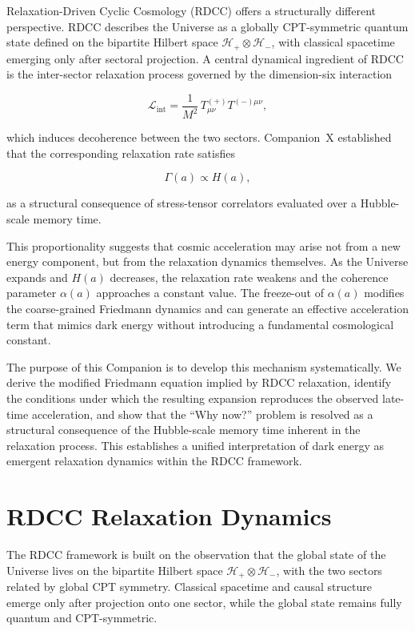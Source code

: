 \documentclass[11pt,a4paper]{article}
\newcommand{\Hglobal}{\mathcal{H}_{+}\!\otimes\!\mathcal{H}_{-}}
\newcommand{\LintDef}{\mathcal{L}_{\mathrm{int}} = \frac{1}{M^{2}}\, T^{(+)}_{\mu\nu} T^{(-)\mu\nu}}
\newcommand{\Ha}{H(a)}
\newcommand{\GammaR}{\Gamma}
\newcommand{\alphaR}{\alpha}
\begin{document}
Relaxation-Driven Cyclic Cosmology (RDCC) offers a structurally different
perspective. RDCC describes the Universe as a globally CPT-symmetric quantum
state defined on the bipartite Hilbert space $\Hglobal$, with classical
spacetime emerging only after sectoral projection. A central dynamical
ingredient of RDCC is the inter-sector relaxation process governed by the
dimension-six interaction


\[
\LintDef,
\]


which induces decoherence between the two sectors. Companion~X established that
the corresponding relaxation rate satisfies


\[
\GammaR(a) \propto \Ha,
\]


as a structural consequence of stress-tensor correlators evaluated over a
Hubble-scale memory time.

This proportionality suggests that cosmic acceleration may arise not from a new
energy component, but from the relaxation dynamics themselves. As the Universe
expands and $\Ha$ decreases, the relaxation rate weakens and the coherence
parameter $\alphaR(a)$ approaches a constant value. The freeze-out of
$\alphaR(a)$ modifies the coarse-grained Friedmann dynamics and can generate an
effective acceleration term that mimics dark energy without introducing a
fundamental cosmological constant.

The purpose of this Companion is to develop this mechanism systematically. We
derive the modified Friedmann equation implied by RDCC relaxation, identify the
conditions under which the resulting expansion reproduces the observed
late-time acceleration, and show that the ``Why now?'' problem is resolved as a
structural consequence of the Hubble-scale memory time inherent in the
relaxation process. This establishes a unified interpretation of dark energy as
emergent relaxation dynamics within the RDCC framework.




\section{RDCC Relaxation Dynamics}

The RDCC framework is built on the observation that the global state of the
Universe lives on the bipartite Hilbert space $\Hglobal$, with the two sectors
related by global CPT symmetry. Classical spacetime and causal structure emerge
only after projection onto one sector, while the global state remains fully
quantum and CPT-symmetric.
\end{document}
